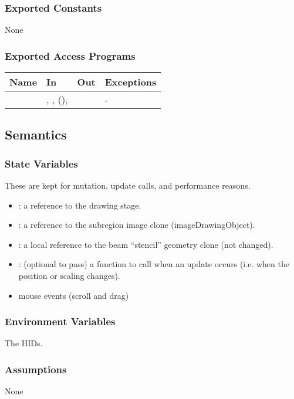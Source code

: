 \documentclass[12pt, titlepage]{article}
\begin{document}
\subsubsection{Exported Constants}
None
\subsubsection{Exported Access Programs}

\begin{center}
\begin{tabular}{L{4cm} L{5cm} L{4cm} L{2cm}}
\hline
\textbf{Name} & \textbf{In} & \textbf{Out} & \textbf{Exceptions} \\
\hline
{} & , ,  (),
  &  & - \\
\hline
\end{tabular}
\end{center}

\subsection{Semantics}

\subsubsection{State Variables}
These are kept for mutation, update calls, and performance reasons.
\begin{itemize}
  \item {}: a reference to the drawing stage.
  \item {}: a reference to the subregion image clone (imageDrawingObject).
  \item {}: a local reference to the beam ``stencil'' geometry clone (not changed).
  \item {}: (optional to pass) a function to call when an update occurs
  (i.e. when the  position or scaling changes).
  \item mouse events (scroll and drag)
\end{itemize}

\subsubsection{Environment Variables}
The HIDs.

\subsubsection{Assumptions}
None
\end{document}
